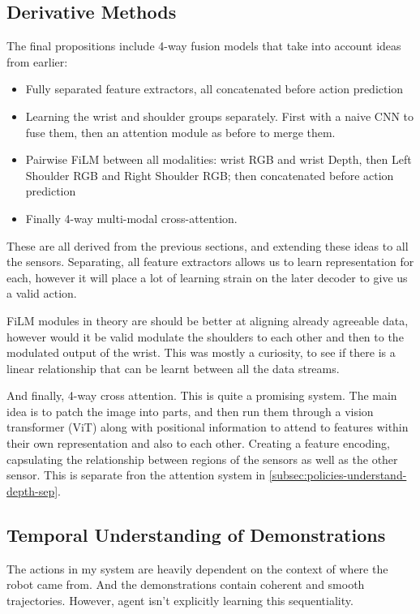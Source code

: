 \subsection{Derivative Methods}\label{subsec:derivative-methods}
The final propositions include 4-way fusion models that take into account ideas from earlier:
\begin{itemize}
  \item Fully separated feature extractors, all concatenated before action prediction 
  \item Learning the wrist and shoulder groups separately. First with a naive CNN to fuse them, then an attention module as before to merge them.
  \item Pairwise FiLM between all modalities: wrist RGB and wrist Depth, then Left Shoulder RGB and Right Shoulder RGB; then concatenated before action prediction
  \item Finally 4-way multi-modal cross-attention. 
\end{itemize}

These are all derived from the previous sections, and extending these ideas to all the sensors. Separating, all feature extractors allows us to learn representation for each, however it will place a lot of learning strain on the later decoder to give us a valid action. 

FiLM modules in theory are should be better at aligning already agreeable data, however would it be valid modulate the shoulders to each other and then to the modulated output of the wrist. This was mostly a curiosity, to see if there is a linear relationship that can be learnt between all the data streams. 

And finally, 4-way cross attention. This is quite a promising system. The main idea is to patch the image into parts, and then run them through a vision transformer (ViT) along with positional information to attend to features within their own representation and also to each other. Creating a feature encoding, capsulating the relationship between regions of the sensors as well as the other sensor. This is separate fron the attention system in \ref{subsec:policies-understand-depth-sep}.

\subsection{Temporal Understanding of Demonstrations}
The actions in my system are heavily dependent on the context of where the robot came from. And the demonstrations contain coherent and smooth trajectories. However, agent isn't explicitly learning this sequentiality. 


